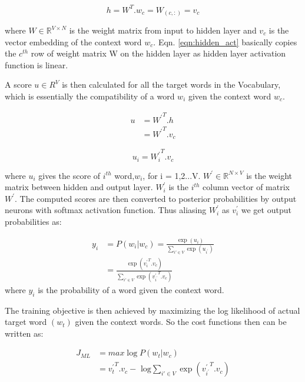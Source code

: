\begin{equation}\label{eqn:hidden_act}
	h = W^T . w_c= W_{(c,:)}=v_{c}
\end{equation}

where $W {\in} \mathbb{R}^{V{\times}N}$ is the weight matrix from input to hidden layer and $v_{c}$ is the vector  embedding of the context word $w_c$. Eqn. \ref{eqn:hidden_act} basically copies the $c^{th}$ row of weight matrix W on the hidden layer as hidden layer activation function is linear. 

A score $u {\in}R^V$ is then calculated for all the target words in the Vocabulary, which is essentially the compatibility of a word $w_i$ given the context word $w_c$.

\begin{equation}
\begin{split}
		 u &={W^{'}} ^ T . h \\
	   	   &= {W^{'}}^T. v_{c}	
\end{split}
\end{equation}

\begin{equation}
	u_i = {W^{'}_i}^T. v_{c}
\end{equation}

where $u_i$ gives the score of $i^{th}$ word,$w_{i}$, for i = 1,2...V. $W^{'}{\in} \mathbb{R}^{N{\times}V} $ is the weight matrix between hidden and output layer. ${W^{'}_i}$ is the $i^{th}$ column vector of matrix $W^{'}$.  
The computed scores are then converted to posterior probabilities by output neurons with softmax activation function. Thus aliasing ${W^{'}_i}$ as $v^{'}_{i}$ we get output probabilities as: 

\begin{equation}
\begin{split}	
y_i &= P(w_i | w_c) = \frac {\exp(u_i)} {\sum_{i' {\in} V} \exp (u_{i^{'}})}\\
	&= \frac {\exp({v^{'}_{i}}^T.v_{c})}{\sum_{i' {\in} V}\exp({v^{'}_{i^{'}}}^T.v_{c})}
\end{split}
\end{equation}
where $y_i$ is the probability of a word given the context word.

The training objective is then achieved by maximizing the log likelihood of actual target word $(w_{t})$ given the context words. So the cost functions then can be written as:

\begin{equation}
  \begin{split}
  	J_{ML} &= max \log P(w_t | w_c) \\
		   &= {v^{'}_{t}}^T.v_{c}- \text{ log} \sum_{i' {\in} V} {\exp({v^{'}_{i^{'}}}^T.v_{c})}
  \end{split}
\end{equation} 

